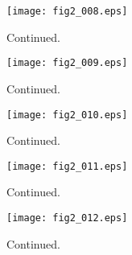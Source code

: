 \documentclass[preprint]{aastex}
\begin{document}
\setcounter{figure}{1}
\begin{figure}[t]
\centering
\texttt{[image: fig2\_008.eps]}
\caption{
Continued. 
}
\label{Fig2}
\end{figure}
\clearpage



\setcounter{figure}{1}
\begin{figure}[t]
\centering
\texttt{[image: fig2\_009.eps]}
\caption{
Continued. 
}
\label{Fig2}
\end{figure}
\clearpage



\setcounter{figure}{1}
\begin{figure}[t]
\centering
\texttt{[image: fig2\_010.eps]}
\caption{
Continued. 
}
\label{Fig2}
\end{figure}
\clearpage



\setcounter{figure}{1}
\begin{figure}[t]
\centering
\texttt{[image: fig2\_011.eps]}
\caption{
Continued. 
}
\label{Fig2}
\end{figure}
\clearpage



\setcounter{figure}{1}
\begin{figure}[t]
\centering
\texttt{[image: fig2\_012.eps]}
\caption{
Continued. 
}
\label{Fig2}
\end{figure}
\clearpage
\end{document}
